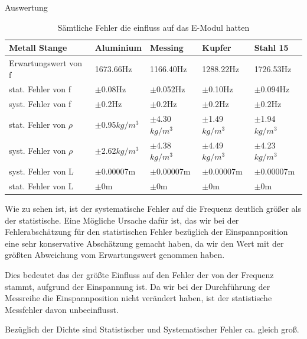 \documentclass[twoside]{protokoll}
\begin{document}
\begin{aufgabe}{Auswertung}
 \begin{table}[H]
        \centering
        \begin{tabularx}{1\textwidth}{l X X X X} %
            \toprule
            \textbf{Metall Stange} & \textbf{Aluminium} & \textbf{Messing} & \textbf{Kupfer} & \textbf{Stahl 15} \\
            \midrule
            Erwartungswert von f & 1673.66Hz & 1166.40Hz & 1288.22Hz & 1726.53Hz \\
            stat. Fehler von f & $\pm$0.08Hz & $\pm$0.052Hz & $\pm$0.10Hz & $\pm$0.094Hz \\
            syst. Fehler von f & $\pm$0.2Hz & $\pm$0.2Hz & $\pm$0.2Hz & $\pm$0.2Hz \\
            \midrule
            stat. Fehler von $\rho$ & $\pm$0.95$kg/m^3$ & $\pm$4.30$kg/m^3$ & $\pm$1.49$kg/m^3$ & $\pm$1.94$kg/m^3$ \\
            syst. Fehler von $\rho$ & $\pm$2.62$kg/m^3$ & $\pm$4.38$kg/m^3$ & $\pm$4.49$kg/m^3$ & $\pm$4.23$kg/m^3$ \\
            \midrule
            syst. Fehler von L      & $\pm$0.00007m     & $\pm$0.00007m     & $\pm$0.00007m     & $\pm$0.00007m \\
            stat. Fehler von L      & $\pm$0m     & $\pm$0m     & $\pm$0m     & $\pm$0m \\
            \bottomrule
        \end{tabularx}
        \caption{Sämtliche Fehler die einfluss auf das E-Modul hatten}
    \end{table}
    
Wie zu sehen ist, ist der systematische Fehler auf die Frequenz deutlich größer als der statistische.
Eine Mögliche Ursache dafür ist, das wir bei der Fehlerabschätzung für den statistischen Fehler bezüglich der Einspannposition eine sehr konservative Abschätzung gemacht haben,
da wir den Wert mit der größten Abweichung vom Erwartungswert genommen haben.

Dies bedeutet das der größte Einfluss auf den Fehler der von der Frequenz stammt, aufgrund der Einspannung ist.
Da wir bei der Durchführung der Messreihe die Einspannposition nicht verändert haben, ist der statistische Messfehler davon unbeeinflusst.

Bezüglich der Dichte sind Statistischer und Systematischer Fehler ca. gleich groß. \\
 

\end{aufgabe}
\end{document}
